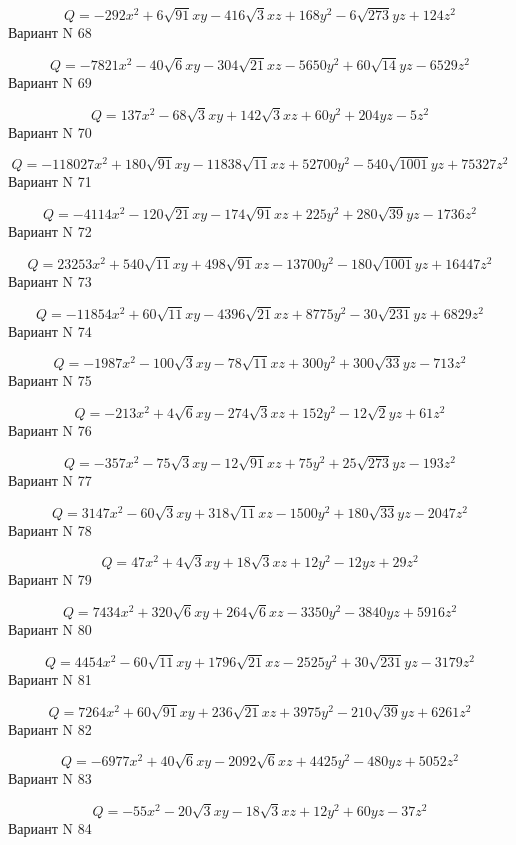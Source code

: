 \documentclass[11pt]{report}
\begin{document}
$$Q = - 292 x^{2} + 6 \sqrt{91} x y - 416 \sqrt{3} x z + 168 y^{2} - 6 \sqrt{273} y z + 124 z^{2}$$Вариант N 68

$$Q = - 7821 x^{2} - 40 \sqrt{6} x y - 304 \sqrt{21} x z - 5650 y^{2} + 60 \sqrt{14} y z - 6529 z^{2}$$Вариант N 69

$$Q = 137 x^{2} - 68 \sqrt{3} x y + 142 \sqrt{3} x z + 60 y^{2} + 204 y z - 5 z^{2}$$Вариант N 70

$$Q = - 118027 x^{2} + 180 \sqrt{91} x y - 11838 \sqrt{11} x z + 52700 y^{2} - 540 \sqrt{1001} y z + 75327 z^{2}$$Вариант N 71

$$Q = - 4114 x^{2} - 120 \sqrt{21} x y - 174 \sqrt{91} x z + 225 y^{2} + 280 \sqrt{39} y z - 1736 z^{2}$$Вариант N 72

$$Q = 23253 x^{2} + 540 \sqrt{11} x y + 498 \sqrt{91} x z - 13700 y^{2} - 180 \sqrt{1001} y z + 16447 z^{2}$$Вариант N 73

$$Q = - 11854 x^{2} + 60 \sqrt{11} x y - 4396 \sqrt{21} x z + 8775 y^{2} - 30 \sqrt{231} y z + 6829 z^{2}$$Вариант N 74

$$Q = - 1987 x^{2} - 100 \sqrt{3} x y - 78 \sqrt{11} x z + 300 y^{2} + 300 \sqrt{33} y z - 713 z^{2}$$Вариант N 75

$$Q = - 213 x^{2} + 4 \sqrt{6} x y - 274 \sqrt{3} x z + 152 y^{2} - 12 \sqrt{2} y z + 61 z^{2}$$Вариант N 76

$$Q = - 357 x^{2} - 75 \sqrt{3} x y - 12 \sqrt{91} x z + 75 y^{2} + 25 \sqrt{273} y z - 193 z^{2}$$Вариант N 77

$$Q = 3147 x^{2} - 60 \sqrt{3} x y + 318 \sqrt{11} x z - 1500 y^{2} + 180 \sqrt{33} y z - 2047 z^{2}$$Вариант N 78

$$Q = 47 x^{2} + 4 \sqrt{3} x y + 18 \sqrt{3} x z + 12 y^{2} - 12 y z + 29 z^{2}$$Вариант N 79

$$Q = 7434 x^{2} + 320 \sqrt{6} x y + 264 \sqrt{6} x z - 3350 y^{2} - 3840 y z + 5916 z^{2}$$Вариант N 80

$$Q = 4454 x^{2} - 60 \sqrt{11} x y + 1796 \sqrt{21} x z - 2525 y^{2} + 30 \sqrt{231} y z - 3179 z^{2}$$Вариант N 81

$$Q = 7264 x^{2} + 60 \sqrt{91} x y + 236 \sqrt{21} x z + 3975 y^{2} - 210 \sqrt{39} y z + 6261 z^{2}$$Вариант N 82

$$Q = - 6977 x^{2} + 40 \sqrt{6} x y - 2092 \sqrt{6} x z + 4425 y^{2} - 480 y z + 5052 z^{2}$$Вариант N 83

$$Q = - 55 x^{2} - 20 \sqrt{3} x y - 18 \sqrt{3} x z + 12 y^{2} + 60 y z - 37 z^{2}$$Вариант N 84
\end{document}
